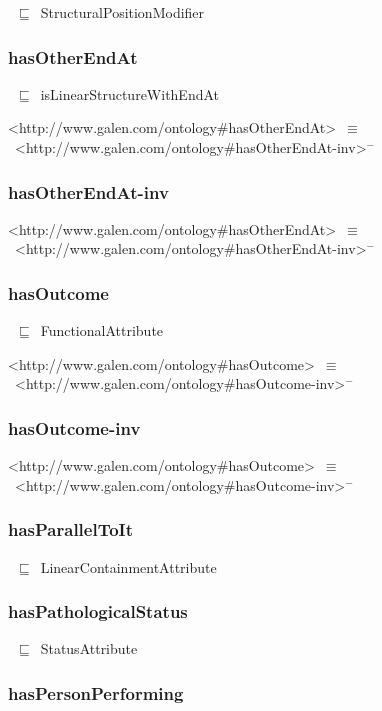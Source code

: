 \documentclass{article}
\begin{document}
~\ensuremath{\sqsubseteq}~StructuralPositionModifier

\subsubsection*{hasOtherEndAt}

~\ensuremath{\sqsubseteq}~isLinearStructureWithEndAt

<http://www.galen.com/ontology#hasOtherEndAt>~\ensuremath{\equiv}~<http://www.galen.com/ontology#hasOtherEndAt-inv>\ensuremath{^-}

\subsubsection*{hasOtherEndAt-inv}

<http://www.galen.com/ontology#hasOtherEndAt>~\ensuremath{\equiv}~<http://www.galen.com/ontology#hasOtherEndAt-inv>\ensuremath{^-}

\subsubsection*{hasOutcome}

~\ensuremath{\sqsubseteq}~FunctionalAttribute

<http://www.galen.com/ontology#hasOutcome>~\ensuremath{\equiv}~<http://www.galen.com/ontology#hasOutcome-inv>\ensuremath{^-}

\subsubsection*{hasOutcome-inv}

<http://www.galen.com/ontology#hasOutcome>~\ensuremath{\equiv}~<http://www.galen.com/ontology#hasOutcome-inv>\ensuremath{^-}

\subsubsection*{hasParallelToIt}

~\ensuremath{\sqsubseteq}~LinearContainmentAttribute

\subsubsection*{hasPathologicalStatus}

~\ensuremath{\sqsubseteq}~StatusAttribute

\subsubsection*{hasPersonPerforming}
\end{document}
